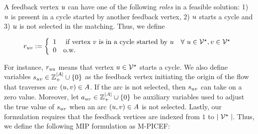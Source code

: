 \documentclass{article}
\begin{document}
A feedback vertex $u$ can have one of the following \textit{roles} in a feasible solution: 1) $u$ is present in a cycle started by another feedback vertex, 2) $u$ starts a cycle and 3) $u$ is not selected in the matching. Thus, we define

$$
	r_{uv}  := \left\{
\begin{array}{lll}
	1     & \mbox{ if vertex } v \mbox{ is in a cycle started by } u& \forall \ u \in \mathcal{V}^{\star}, v \in \mathcal{V}^{\star}\\
	0     & \mbox{o.w.}
\end{array}
\right.
$$

For instance, $r_{uu}$ means that vertex $u \in \mathcal{V}^{\star}$ starts a cycle. We also define variables $s_{uv} \in \mathbb{Z}^{\mid A \mid}_{+} \cup \{0\}$ as the feedback vertex initiating the origin of the flow that traverses arc $(u,v)\in A$. If the arc is not selected, then $s_{uv}$ can take on a zero value. Moreover, let $a_{uv} \in \mathbb{Z}^{\mid A \mid}_{+} \cup \{0\}$ be auxiliary variables  used to adjust the true value of $s_{uv}$ when an arc $(u,v) \in A$ is not selected. Lastly, our formulation requires that the feedback vertices are indexed from $1$ to $\mid \mathcal{V}^{\star} \mid$. Thus, we define the following MIP formulation as M-PICEF:
\end{document}
